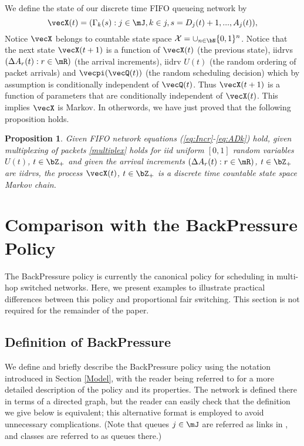 \documentclass{amsart}
\newtheorem{proposition}{Proposition}
\begin{document}
We define the state of our discrete time FIFO queueing network by
\begin{equation}\label{eq:Markov.Chain.X}
\vecX (t)=(\Gamma_k(s) : j\in\mJ, k\in j, s=D_j(t)+1,...,A_j(t)),
\end{equation}
Notice $\vecX$ belongs to countable state space $\mathcal X = \cup_{n\in\bN}\{ 0,1\}^n$. Notice that the next state $\vecX(t+1)$ is a function of $\vecX(t)$ (the previous state), iidrvs $(\Delta A_r(t): r\in\mR)$ (the arrival increments), iidrv $U(t)$ (the random ordering of packet arrivals) and $\vecpi(\vecQ(t))$ (the random scheduling decision) which by assumption is conditionally independent of $\vecQ(t)$. Thus $\vecX(t+1)$ is a function of parameters that are conditionally independent of $\vecX(t)$. This implies $\vecX$ is Markov. In otherwords, we have just proved that the following proposition holds.

\begin{proposition}
Given FIFO network equations  (\ref{eq:Incr}-\ref{eq:ADk}) hold, given multiplexing of packets \eqref{multiplex} holds for iid uniform $[0,1]$ random variables $U(t)$, $t\in\bZ_+$ and given the arrival increments $(\Delta A_r(t) : r\in\mR)$, $t\in\bZ_+$ are iidrvs, the process $\vecX(t)$, $t\in\bZ_+$ is a discrete time countable state space Markov chain.
\end{proposition}
\fi

\section{Comparison with the BackPressure Policy}
 \label{Comparison}\label{BP Compare}
The BackPressure policy is currently  the canonical policy for scheduling in multi-hop switched networks.
Here, we present examples to illustrate practical differences between this policy and proportional fair switching. 
This section is not required for the remainder of the paper.

\subsection{Definition of BackPressure}
We define and briefly describe the BackPressure policy using the notation introduced in Section \ref{Model}, with the reader being referred to \cite{TaEp92} for a more detailed description of the policy and its properties. The network is defined there in terms of a directed graph, but the reader can easily check that the definition we give below is equivalent; this alternative format is employed to avoid unnecessary complications. (Note that  queues $j\in\mJ$ are referred as links in \cite{TaEp92}, and  classes are referred to as queues there.) 
\end{document}
